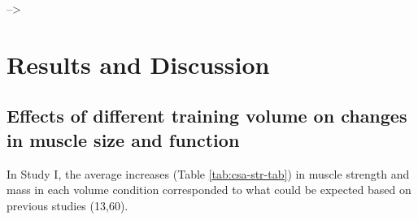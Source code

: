 \documentclass[twoside,10pt]{gihclass} %
\begin{document}
--\textgreater{}

\hypertarget{results-and-discussion}{%
\chapter{Results and Discussion}\label{results-and-discussion}}

\hypertarget{effects-of-different-training-volume-on-changes-in-muscle-size-and-function}{%
\section{Effects of different training volume on changes in muscle size and function}\label{effects-of-different-training-volume-on-changes-in-muscle-size-and-function}}

In Study I, the average increases (Table \ref{tab:csa-str-tab}) in muscle strength and mass in each volume condition corresponded to what could be expected based on previous studies
(13,60).
\end{document}
